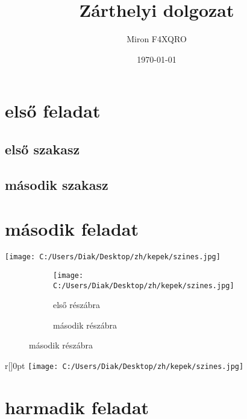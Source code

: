 \documentclass[11pt]{book}
\title{Zárthelyi dolgozat}
\author{Miron F4XQRO}
\date{\today}
\begin{document}
\maketitle
\pagestyle{fancy}
\fancyhead[LE]{\leftmark}
\fancyhead[RO]{\rightmark}
\fancyhf[]{\nouppercase{\leftmark}}
\fancyfoot[LE,RO]{\thepage}
\chapter{első feladat}
\section{első szakasz}
\hulipsum
\section{második szakasz}
\hulipsum


\chapter{második feladat}
\texttt{[image: C:/Users/Diak/Desktop/zh/kepek/szines.jpg]}


\begin{figure}[hb]
\centering
\caption{ábra felirata}
\begin{subfigure}{5cm}
\centering
\caption{első részábra}
\texttt{[image: C:/Users/Diak/Desktop/zh/kepek/szines.jpg]}
\end{subfigure}

\begin{subfigure}{5cm}
\centering
\caption{második részábra}
\end{subfigure}
\end{figure}
\hulipsum

\begin{wrapfigure}[12]{r}[\marginparwidth]{0pt}
\hulipsum
\texttt{[image: C:/Users/Diak/Desktop/zh/kepek/szines.jpg]}
\hulipsum

\end{wrapfigure}


\chapter{harmadik feladat}
\end{document}
